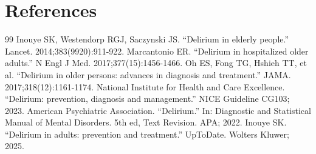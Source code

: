 \section*{References}
\begin{thebibliography}{99}
 Inouye SK, Westendorp RGJ, Saczynski JS. ``Delirium in elderly people.'' Lancet. 2014;383(9920):911-922.
 Marcantonio ER. ``Delirium in hospitalized older adults.'' N Engl J Med. 2017;377(15):1456-1466.
 Oh ES, Fong TG, Hshieh TT, et al. ``Delirium in older persons: advances in diagnosis and treatment.'' JAMA. 2017;318(12):1161-1174.
 National Institute for Health and Care Excellence. ``Delirium: prevention, diagnosis and management.'' NICE Guideline CG103; 2023.
 American Psychiatric Association. ``Delirium.'' In: Diagnostic and Statistical Manual of Mental Disorders. 5th ed, Text Revision. APA; 2022.
 Inouye SK. ``Delirium in adults: prevention and treatment.'' UpToDate. Wolters Kluwer; 2025.
\end{thebibliography}

